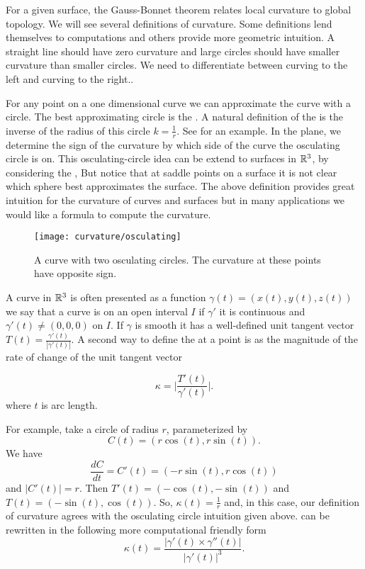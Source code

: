 
For a given surface, the Gauss-Bonnet theorem relates local curvature
to global topology. 
We will see several definitions of curvature.
Some definitions lend themselves to computations and others provide
more geometric intuition.
A straight line should have zero curvature and
 large circles should have smaller curvature than smaller circles.
We need to differentiate between
curving to the left and curving to the right..

For any point on a one dimensional curve
we can approximate the curve with a circle.
The best approximating circle is the  .
A natural definition of the  is the inverse of the radius of this circle $k=\frac{1}{r}$.
See  for an example.
In the plane, we determine the sign of the curvature by which side of the curve the osculating circle is on.
 This osculating-circle idea can be extend
to  surfaces in $\mathbb{R}^3$, by considering the ,
But notice that at saddle points on a surface it is not clear which sphere
best approximates the surface.
The above definition provides great intuition for the curvature of curves
and surfaces but in many applications we would like a formula to compute
the curvature.


\begin{figure}[htb]
	\centering
	\texttt{[image: curvature/osculating]}
	\caption{A curve with two osculating circles. The curvature at these points
	have opposite sign.}
	\label{fig:osculating-circle}
\end{figure}

A curve in $\mathbb{R}^3$ is often presented as a function
$\gamma(t)=(x(t),y(t),z(t))$ we say that a curve is  on an open interval $I$
if $\gamma'$ it is continuous and $\gamma'(t)\neq (0,0,0)$ on $I$. 
If $\gamma$ is smooth it has a well-defined unit tangent vector $T(t)=\frac{\gamma'(t)}{|\gamma'(t)|}.$
A second way to define the   at a point is as the magnitude of the rate of change of the 
unit tangent vector

\begin{equation} \label{eqn:kappa}
\kappa=\bigg  | \frac{T'(t)}{\gamma'(t)}\bigg |.
\end{equation}
where $t$ is arc length.

For example, take a circle of radius $r$, parameterized by 
$$C(t)=\left(r\cos(t),r\sin(t)\right).$$
We have 
$$\frac{dC}{dt}=C'(t)=\left(-r\sin(t),r\cos(t)\right)$$ and $|C'(t)|=r.$
Then $T'(t)=\left(-\cos(t),-\sin(t)\right)$ and $T(t)=\left(-\sin(t),\cos(t)\right)$.
So, $\kappa(t)=\frac{1}{r}$ and, in this case, our definition of curvature agrees with the
osculating circle intuition given above. 
 can be rewritten in the following more computational friendly form 
\begin{equation} \label{eqn:kappa1}
\kappa(t)=\frac{|\gamma'(t)\times \gamma''(t)|}{|\gamma'(t)|^3}.
\end{equation}

